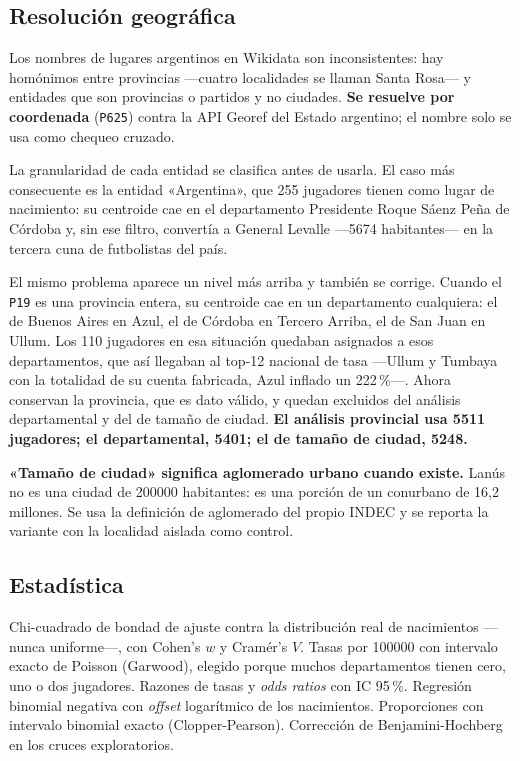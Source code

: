 \documentclass[11pt,a4paper]{article}
\begin{document}
\subsection{Resolución geográfica}
\label{sec:geografia}

Los nombres de lugares argentinos en Wikidata son inconsistentes: hay homónimos
entre provincias —cuatro localidades se llaman Santa Rosa— y entidades que son
provincias o partidos y no ciudades. \textbf{Se resuelve por coordenada}
(\texttt{P625}) contra la API Georef del Estado argentino; el nombre solo se usa
como chequeo cruzado.

La granularidad de cada entidad se clasifica antes de usarla. El caso más
consecuente es la entidad «Argentina», que 255 jugadores tienen como lugar de
nacimiento: su centroide cae en el departamento Presidente Roque Sáenz Peña de
Córdoba y, sin ese filtro, convertía a General Levalle —\num{5674} habitantes— en
la tercera cuna de futbolistas del país.

El mismo problema aparece un nivel más arriba y también se corrige. Cuando el
\texttt{P19} es una provincia entera, su centroide cae en un departamento
cualquiera: el de Buenos Aires en Azul, el de Córdoba en Tercero Arriba, el de
San Juan en Ullum. Los 110 jugadores en esa situación quedaban asignados a esos
departamentos, que así llegaban al top-12 nacional de tasa —Ullum y Tumbaya con
la totalidad de su cuenta fabricada, Azul inflado un 222\,\%—. Ahora conservan la
provincia, que es dato válido, y quedan excluidos del análisis departamental y
del de tamaño de ciudad. \textbf{El análisis provincial usa \num{5511}
jugadores; el departamental, \num{5401}; el de tamaño de ciudad, \num{5248}.}

\textbf{«Tamaño de ciudad» significa aglomerado urbano cuando existe.} Lanús no
es una ciudad de \num{200000} habitantes: es una porción de un conurbano de 16,2
millones. Se usa la definición de aglomerado del propio INDEC y se reporta la
variante con la localidad aislada como control.

\subsection{Estadística}

Chi-cuadrado de bondad de ajuste contra la distribución real de nacimientos
—nunca uniforme—, con Cohen's $w$ y Cramér's $V$. Tasas por \num{100000} con
intervalo exacto de Poisson (Garwood), elegido porque muchos departamentos tienen
cero, uno o dos jugadores. Razones de tasas y \emph{odds ratios} con IC 95\,\%.
Regresión binomial negativa con \emph{offset} logarítmico de los nacimientos.
Proporciones con intervalo binomial exacto (Clopper-Pearson). Corrección de
Benjamini-Hochberg en los cruces exploratorios.
\end{document}
